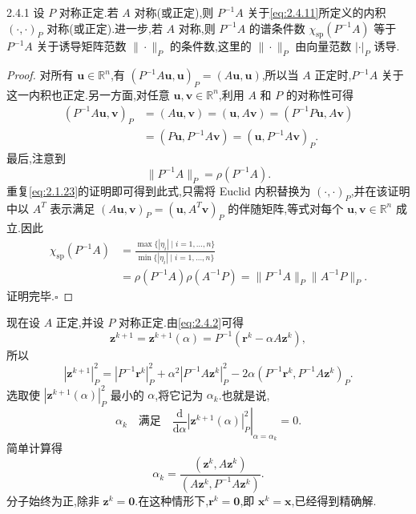 \begin{lemma}[]{2.4.1}
设 \(P\) 对称正定.若 \(A\) 对称(或正定),则 \(P^{-1}A\) 关于\eqref{eq:2.4.11}所定义的内积 \((\cdot,\cdot)_P\) 对称(或正定).进一步,若 \(A\) 对称,则 \(P^{-1}A\) 的谱条件数 \(\chi_{\mathrm{sp}}(P^{-1}A)\) 等于 \(P^{-1}A\) 关于诱导矩阵范数 \(\|\cdot\|_P\) 的条件数,这里的 \(\|\cdot\|_P\) 由向量范数 \(|\cdot|_P\) 诱导.
\end{lemma}

\begin{proof}
对所有 \(\boldsymbol{u}\in\mathbb R^n\),有
\((P^{-1}A\boldsymbol{u},\boldsymbol{u})_P=(A\boldsymbol{u},\boldsymbol{u})\),所以当 \(A\) 正定时,\(P^{-1}A\) 关于这一内积也正定.另一方面,对任意 \(\boldsymbol{u},\boldsymbol{v}\in\mathbb R^n\),利用 \(A\) 和 \(P\) 的对称性可得
\[
  \begin{aligned}
    (P^{-1}A\boldsymbol{u},\boldsymbol{v})_P
      &=(A\boldsymbol{u},\boldsymbol{v})=(\boldsymbol{u},A\boldsymbol{v})=(P^{-1}P\boldsymbol{u},A\boldsymbol{v})\\
      &=(P\boldsymbol{u},P^{-1}A\boldsymbol{v})=(\boldsymbol{u},P^{-1}A\boldsymbol{v})_P.
  \end{aligned}
\]
最后,注意到
\[
  \|P^{-1}A\|_P=\rho(P^{-1}A).
\]
重复\eqref{eq:2.1.23}的证明即可得到此式,只需将 Euclid 内积替换为 \((\cdot,\cdot)_P\),并在该证明中以 \(A^T\) 表示满足
\((A\boldsymbol{u},\boldsymbol{v})_P=(\boldsymbol{u},A^T\boldsymbol{v})_P\) 的伴随矩阵,等式对每个 \(\boldsymbol{u},\boldsymbol{v}\in\mathbb R^n\) 成立.因此
\[
  \begin{aligned}
    \chi_{\mathrm{sp}}(P^{-1}A)
    &=\frac{\max\{|\eta_i|\mid i=1,\ldots,n\}}{\min\{|\eta_i|\mid i=1,\ldots,n\}}\\
    &=\rho(P^{-1}A)\rho(A^{-1}P)
      =\|P^{-1}A\|_P\|A^{-1}P\|_P.
  \end{aligned}
\]
证明完毕.\hfill\(\square\)
\end{proof}

现在设 \(A\) 正定,并设 \(P\) 对称正定.由\eqref{eq:2.4.2}可得
\[
  \boldsymbol{z}^{k+1}=\boldsymbol{z}^{k+1}(\alpha)=P^{-1}(\boldsymbol{r}^k-\alpha A\boldsymbol{z}^k),
\]
所以
\[
  |\boldsymbol{z}^{k+1}|_P^2=|P^{-1}\boldsymbol{r}^k|_P^2+\alpha^2|P^{-1}A\boldsymbol{z}^k|_P^2
    -2\alpha(P^{-1}\boldsymbol{r}^k,P^{-1}A\boldsymbol{z}^k)_P.
\]
选取使 \(|\boldsymbol{z}^{k+1}(\alpha)|_P^2\) 最小的 \(\alpha\),将它记为 \(\alpha_k\).也就是说,
\begin{equation}\label{eq:2.4.12}
  \alpha_k\quad\text{满足}\quad
  \left.\frac{\mathrm d}{\mathrm d\alpha}|\boldsymbol{z}^{k+1}(\alpha)|_P^2\right|_{\alpha=\alpha_k}=0.
\end{equation}
简单计算得
\begin{equation}\label{eq:2.4.13}
  \alpha_k=\frac{(\boldsymbol{z}^k,A\boldsymbol{z}^k)}
                 {(A\boldsymbol{z}^k,P^{-1}A\boldsymbol{z}^k)}.
\end{equation}
分子始终为正,除非 \(\boldsymbol{z}^k=\boldsymbol{0}\).在这种情形下,\(\boldsymbol{r}^k=\boldsymbol{0}\),即 \(\boldsymbol{x}^k=\boldsymbol{x}\),已经得到精确解.

